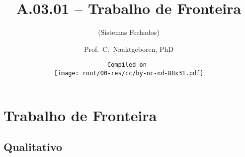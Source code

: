 \makeatletter
\immediate{} %
\makeatother


\title{A.03.01 -- Trabalho de Fronteira}
\subtitle{(Sistemas Fechados)}
\author{Prof.~C.~Naaktgeboren, PhD}
\date{%
    \texttt{Compiled on }\\[\medskipamount]
    \texttt{[image: root/00-res/cc/by-nc-nd-88x31.pdf]}
}

\frame{\titlepage}
\frame{\tableofcontents}
\section{Trabalho de Fronteira}

\subsection{Qualitativo}


